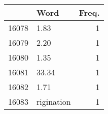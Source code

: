 \begin{tabular}{rlr}
  \toprule
 & Word & Freq. \\ 
  \midrule
16078 & 1.83 & 1 \\ 
  16079 & 2.20 & 1 \\ 
  16080 & 1.35 & 1 \\ 
  16081 & 33.34 & 1 \\ 
  16082 & 1.71 & 1 \\ 
  16083 & rigination & 1 \\ 
   \bottomrule
\end{tabular}
